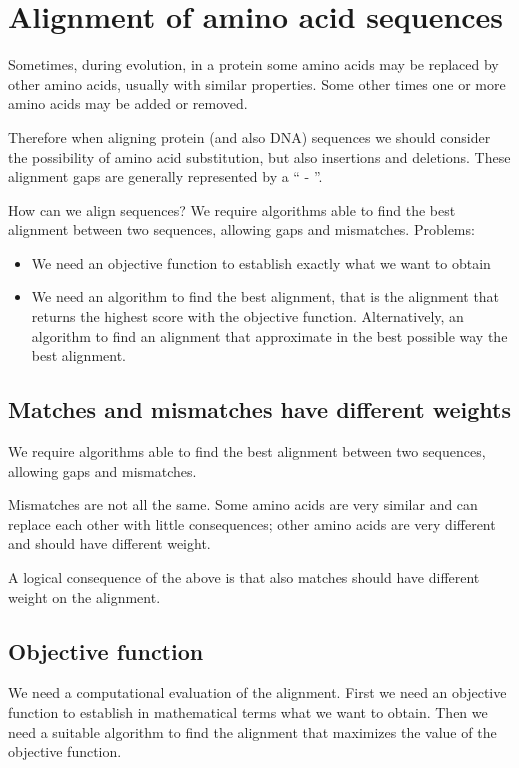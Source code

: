 \section{Alignment of amino acid sequences}

Sometimes, during evolution, in a protein some amino acids may be replaced 
by other amino acids, usually with similar properties. Some other times one or 
more amino acids may be added or removed. 

Therefore when aligning protein (and also DNA) sequences we should consider 
the possibility of amino acid substitution, but also insertions and deletions.
These alignment gaps are generally represented by a `` - ''.

How can we align sequences?
We require algorithms able to find the best alignment between two sequences,
allowing gaps and mismatches.
Problems:
\begin{itemize}
  \item We need an objective function to establish exactly what we want to 
obtain
  \item We need an algorithm to find the best alignment, that is the alignment
that returns the highest score with the objective function. Alternatively, an
algorithm to find an alignment that approximate in the best possible way the
best alignment.
\end{itemize}

\subsection{Matches and mismatches have different weights}

We require algorithms able to find the best alignment between two sequences,
allowing gaps and mismatches.

Mismatches are not all the same. Some amino acids are very similar and can 
replace each other with little consequences; other amino acids are very different 
and should have different weight.

A logical consequence of the above is that also matches should have different 
weight on the alignment.

\subsection{Objective function}

We need a computational evaluation of the alignment. First we need an objective 
function to establish in mathematical terms what we want to obtain. 
Then we need a suitable algorithm to find the alignment that maximizes the 
value of the objective function.

